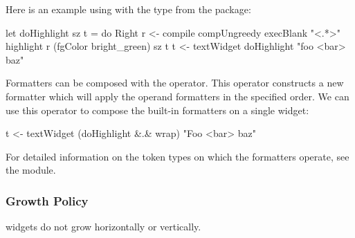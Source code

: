 Here is an example using  with the  type from
the  package:

\begin{haskellcode}
 let doHighlight sz t = do
   Right r <- compile compUngreedy execBlank "<.*>"
   highlight r (fgColor bright_green) sz t
 t <- textWidget doHighlight "foo <bar> baz"
\end{haskellcode}

Formatters can be composed with the  operator.  This
operator constructs a new formatter which will apply the operand
formatters in the specified order.  We can use this operator to
compose the built-in formatters on a single  widget:

\begin{haskellcode}
 t <- textWidget (doHighlight &.& wrap) "Foo <bar> baz"
\end{haskellcode}

For detailed information on the token types on which the formatters
operate, see the  module.

\subsubsection{Growth Policy}

 widgets do not grow horizontally or vertically.
